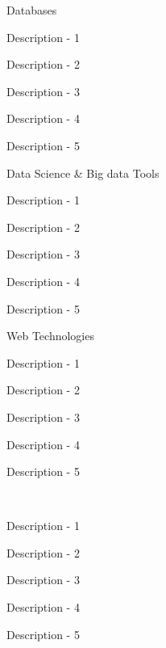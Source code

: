 \documentclass[11pt, a4paper]{resume-lab}
\begin{document}
\begin{Parallel}[v]{0.265\textwidth}{0.66\textwidth}
{\begin{textblock}{2}
	\skillsection
	{Databases}
	{
		\begin{skillitems} %
			\item {Description - 1}
			\item {Description - 2}
			\item {Description - 3}
			\item {Description - 4}
			\item {Description - 5}
		\end{skillitems}
	}
	
	\skillsection
	{Data Science \& Big data Tools}
	{
		\begin{skillitems} %
			\item {Description - 1}
			\item {Description - 2}
			\item {Description - 3}
			\item {Description - 4}
			\item {Description - 5}
		\end{skillitems}
	}
	
	\skillsection
	{Web Technologies}
	{
		\begin{skillitems} %
			\item {Description - 1}
			\item {Description - 2}
			\item {Description - 3}
			\item {Description - 4}
			\item {Description - 5}
		\end{skillitems}
	}
	
	\vspace{5mm}\\
	\interestsection
	{
		\begin{skillitems} %
			\item {Description - 1}
			\item {Description - 2}
			\item {Description - 3}
			\item {Description - 4}
			\item {Description - 5}
		\end{skillitems}
	}
	
\end{textblock}

}
\ParallelPar

\newpage

\ParallelRText{\noindent

}
\end{Parallel}
\end{document}
